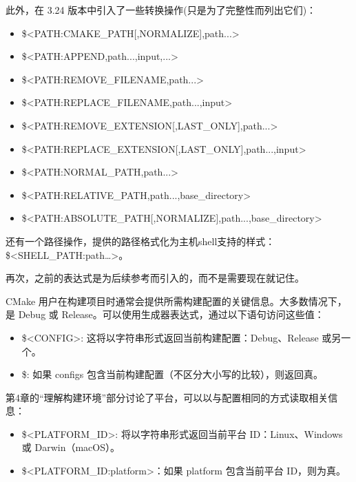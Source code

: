 此外，在 3.24 版本中引入了一些转换操作(只是为了完整性而列出它们)：

\begin{itemize}
\item
\$<PATH:CMAKE\_PATH[,NORMALIZE],path...>

\item
\$<PATH:APPEND,path...,input,...>

\item
\$<PATH:REMOVE\_FILENAME,path...>

\item
\$<PATH:REPLACE\_FILENAME,path...,input>

\item
\$<PATH:REMOVE\_EXTENSION[,LAST\_ONLY],path...>

\item
\$<PATH:REPLACE\_EXTENSION[,LAST\_ONLY],path...,input>

\item
\$<PATH:NORMAL\_PATH,path...>

\item
\$<PATH:RELATIVE\_PATH,path...,base\_directory>

\item
\$<PATH:ABSOLUTE\_PATH[,NORMALIZE],path...,base\_directory>
\end{itemize}

还有一个路径操作，提供的路径格式化为主机shell支持的样式：\$<SHELL\_PATH:path…>。

再次，之前的表达式是为后续参考而引入的，而不是需要现在就记住。


CMake 用户在构建项目时通常会提供所需构建配置的关键信息。大多数情况下，是 Debug 或 Release。可以使用生成器表达式，通过以下语句访问这些值：

\begin{itemize}
\item
\$<CONFIG>: 这将以字符串形式返回当前构建配置：Debug、Release 或另一个。

\item
\$<CONFIG:configs>: 如果 configs 包含当前构建配置（不区分大小写的比较），则返回真。
\end{itemize}

第4章的“理解构建环境”部分讨论了平台，可以以与配置相同的方式读取相关信息：

\begin{itemize}
\item
\$<PLATFORM\_ID>: 将以字符串形式返回当前平台 ID：Linux、Windows 或 Darwin（macOS）。

\item
\$<PLATFORM\_ID:platform>：如果 platform 包含当前平台 ID，则为真。
\end{itemize}

